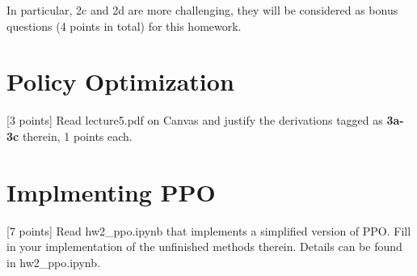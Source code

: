 In particular, 2c and 2d are more challenging, they will be considered as bonus questions (4 points in total) for this homework.


\section{Policy Optimization}
{[3 points]} Read lecture5.pdf on Canvas and justify the derivations tagged as {\bf 3a-3c} therein, 1 points each.

\section{Implmenting PPO}
{[7 points]} Read hw2\_ppo.ipynb that implements a simplified version of PPO.
Fill in your implementation of the unfinished methods therein.
Details can be found in hw2\_ppo.ipynb.



